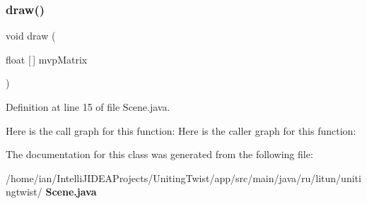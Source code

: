 \subsubsection{draw()}
{\footnotesize\ttfamily void draw (\begin{DoxyParamCaption}\item[{float [$\,$]}]{mvp\+Matrix }\end{DoxyParamCaption})}



Definition at line 15 of file Scene.\+java.

Here is the call graph for this function\+:
Here is the caller graph for this function\+:


The documentation for this class was generated from the following file\+:\begin{DoxyCompactItemize}
\item 
/home/ian/\+Intelli\+J\+I\+D\+E\+A\+Projects/\+Uniting\+Twist/app/src/main/java/ru/litun/unitingtwist/\textbf{ Scene.\+java}\end{DoxyCompactItemize}
